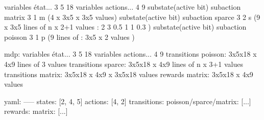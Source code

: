 variables état... 				3 5 18
variables actions...				4 9
substate(active bit) subaction matrix		3 1 m (4 x 3x5 x 3x5 values)
substate(active bit) subaction sparce		3 2 s (9 x 3x5 lines of n x 2+1 values : 2 3 0.5 1 1 0.3 )
substate(active bit) subaction poisson		3 1 p (9 lines of : 3x5 x 2 values )

mdp:
variables état... 				3 5 18
variables actions...				4 9
transitions poisson:
3x5x18 x 4x9 lines of 3 values
transitions sparce:
3x5x18 x 4x9 lines of n x 3+1 values
transitions matrix:
3x5x18 x 4x9 x 3x5x18 values
rewards matrix:
3x5x18 x 4x9 values

yaml:
-----
states: [2, 4, 5]
actions: [4, 2]
transitions:
  poisson/sparce/matrix: [...]
rewards:
  matrix: [...]